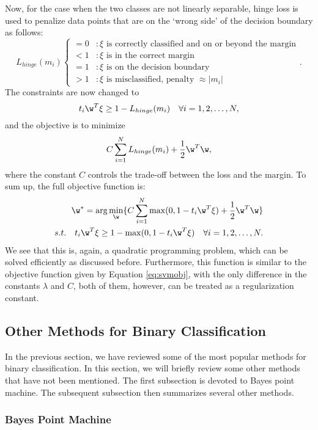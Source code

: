 Now, for the case when the two classes are not linearly separable, hinge loss is used to penalize data points that are on the `wrong side' of the decision boundary as follows:
$$L_{hinge}(m_i) 
\left\{
     \begin{array}{ll}
       = 0 & : \xi \text{ is correctly classified and on or beyond the margin}\\
       < 1 & : \xi \text{ is in the correct margin}\\
       = 1 & : \xi \text{ is on the decision boundary}\\
       > 1 & : \xi \text{ is misclassified, penalty } \approx |m_i|
     \end{array}
   \right..
$$
The constraints are now changed to 
$$ t_i\w^T \xi \geq 1 - L_{hinge}(m_i) \quad \forall i = 1, 2, \dots, N,$$
and the objective is to minimize 
$$ C \sum_{i=1}^N L_{hinge}(m_i) + \frac{1}{2} \w^T\w,$$  
where the constant $C$ controls the trade-off between the loss and the margin. To sum up, the full objective function is:
\[ \begin{split}
\w^* = \arg\min_{\w} \{ C \sum_{i=1}^N  \max(0, 1 - t_i \w^T \xi) + \frac{1}{2} \w^T\w \} \\
s.t. \quad t_i\w^T \xi \geq 1 - \max(0, 1 - t_i \w^T \xi) \quad \forall i = 1, 2, \dots, N.
\end{split} \] 
We see that this is, again, a quadratic programming problem, which can be solved efficiently as discussed before. Furthermore, this function is similar to the objective function given by Equation \ref{eq:svmobj}, with the only difference in the constants $\lambda$ and $C$, both of them, however, can be treated as a regularization constant.


\subsection{Other Methods for Binary Classification}
\label{sec:bgr.others}

In the previous section, we have reviewed some of the most popular methods for binary classification. In this section, we will briefly review some other methods that have not been mentioned. The first subsection is devoted to Bayes point machine. The subsequent subsection then summarizes several other methods.  

\subsubsection{Bayes Point Machine}

